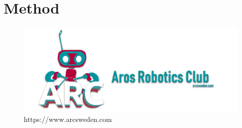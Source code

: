 \section{Method}
\blindtext %
\begin{figure}[H]
    \centering
    \includegraphics[width=\columnwidth]{image/ARC}
    \caption{https://www.arcsweden.com}
    \label{fig:ARCbanner}
\end{figure}